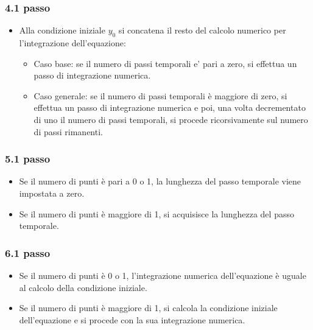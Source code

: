 \subsubsection*{4.1 passo}
\begin{itemize}
\item Alla condizione iniziale $y_0$ si concatena il resto del calcolo numerico per l'integrazione dell'equazione:
\begin{itemize}
\item Caso base: se il numero di passi temporali e' pari a zero, si effettua un passo di integrazione numerica.
\item Caso generale: se il numero di passi temporali è maggiore di zero, si effettua un passo di integrazione numerica e poi, una volta decrementato di uno il numero di passi temporali, si procede ricorsivamente sul numero di passi rimanenti. 
\end{itemize}
\end{itemize}

\subsubsection*{5.1 passo}
\begin{itemize}
\item Se il numero di punti è pari a 0 o 1, la lunghezza del passo temporale viene impostata a zero.
\item Se il numero di punti è maggiore di 1, si acquisisce la lunghezza del passo temporale.
\end{itemize}

\subsubsection*{6.1 passo}
\begin{itemize}
\item Se il numero di punti è 0 o 1, l'integrazione numerica dell'equazione è uguale al calcolo della condizione iniziale.
\item Se il numero di punti è maggiore di 1, si calcola la condizione iniziale dell'equazione e si procede con la sua integrazione numerica.
\end{itemize}

